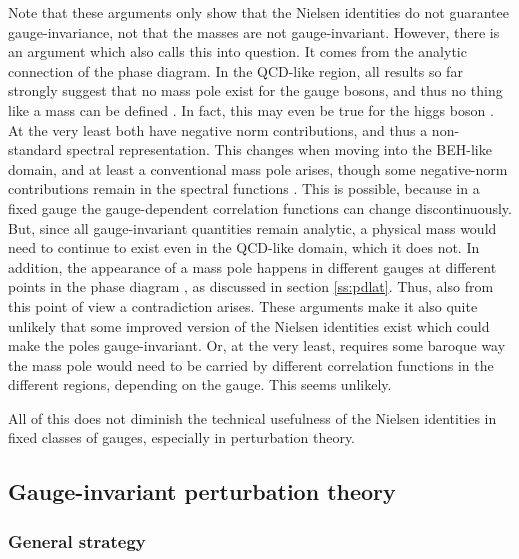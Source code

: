 \documentclass[final,twoside,12pt]{article}
\newcommand*{\1}{1\!\!\!\bot}
\begin{document}
Note that these arguments only show that the Nielsen identities do not guarantee gauge-invariance, not that the masses are not gauge-invariant. However, there is an argument which also calls this into question. It comes from the analytic connection of the phase diagram. In the QCD-like region, all results so far strongly suggest that no mass pole exist for the gauge bosons, and thus no thing like a mass can be defined \cite{Maas:2010nc,Capri:2012cr,Maas:2013aia}. In fact, this may even be true for the higgs boson \cite{Maas:2016edk}. At the very least both have negative norm contributions, and thus a non-standard spectral representation. This changes when moving into the BEH-like domain, and at least a conventional mass pole arises, though some negative-norm contributions remain in the spectral functions \cite{Maas:2010nc,Maas:2013aia,Raubitzek:unpublished}. This is possible, because in a fixed gauge the gauge-dependent correlation functions can change discontinuously. But, since all gauge-invariant quantities remain analytic, a physical mass would need to continue to exist even in the QCD-like domain, which it does not. In addition, the appearance of a mass pole happens in different gauges at different points in the phase diagram \cite{Caudy:2007sf}, as discussed in section \ref{ss:pdlat}. Thus, also from this point of view a contradiction arises. These arguments make it also quite unlikely that some improved version of the Nielsen identities exist which could make the poles gauge-invariant. Or, at the very least, requires some baroque way the mass pole would need to be carried by different correlation functions in the different regions, depending on the gauge. This seems unlikely.

All of this does not diminish the technical usefulness of the Nielsen identities in fixed classes of gauges, especially in perturbation theory.

\subsection{Gauge-invariant perturbation theory}\label{ss:gipt}

\subsubsection{General strategy}\label{ss:rules}
\end{document}
